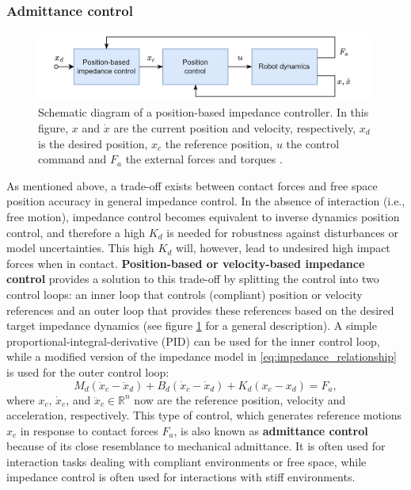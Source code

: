 \subsubsection{Admittance control}

\begin{figure}
  \centering
  \includegraphics[width=0.9\linewidth]{figures/position_impedance.png}

  \caption[Position-based impedance control diagram.]{Schematic diagram of a position-based impedance controller. In this figure, $x$ and $\dot{ x }$ are the current position and velocity, respectively, $x_d$ is the desired position, $x_c$ the reference position, $u$ the control command and $F_a$ the external forces and torques \cite{ottCartesianImpedanceControl2008}.} \label{fig:position_based_impedance_control}
\end{figure}
As mentioned above, a trade-off exists between contact forces and free space position accuracy in general impedance control. In the absence of interaction (i.e., free motion), impedance control becomes equivalent to inverse dynamics position control, and therefore a high $K_d$ is needed for robustness against disturbances or model uncertainties. This high $K_d$ will, however, lead to undesired high impact forces when in contact. \textbf{Position-based or velocity-based impedance control} provides a solution to this trade-off by splitting the control into two control loops: an inner loop that controls (compliant) position or velocity references and an outer loop that provides these references based on the desired target impedance dynamics (see figure \ref{fig:position_based_impedance_control} for a general description). A simple proportional-integral-derivative (PID) can be used for the inner control loop, while a modified version of the impedance model in \eqref{eq:impedance_relationship} is used for the outer control loop:
\begin{equation}
  M_d \left(\ddot{ x }_c -\ddot{x}_d \right)+ B_d \left(\dot{ x }_c - \dot{ x }_d \right)+ K_d \left( x_c - x_d \right)= F_a,
\end{equation}
where $x_c$, $\dot{ x }_c$, and $\ddot{ x }_c \in\mathbb{R}^n$ now are the reference position, velocity and acceleration, respectively. This type of control, which generates reference motions $x_c$ in response to contact forces $F_a$, is also known as \textbf{admittance control} because of its close resemblance to mechanical admittance. It is often used for interaction tasks dealing with compliant environments or free space, while impedance control is often used for interactions with stiff environments.

